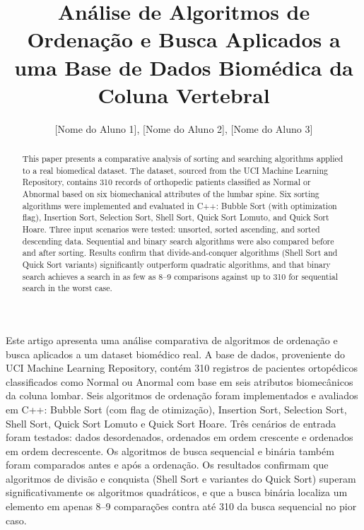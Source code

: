 \documentclass[12pt]{article}
\title{Análise de Algoritmos de Ordenação e Busca Aplicados a uma Base de Dados Biomédica da Coluna Vertebral}
\author{[Nome do Aluno 1]\inst{1}, [Nome do Aluno 2]\inst{1}, [Nome do Aluno 3]\inst{1}}
\begin{document}
\maketitle

\begin{abstract}
This paper presents a comparative analysis of sorting and searching algorithms applied to a real biomedical dataset. The dataset, sourced from the UCI Machine Learning Repository, contains 310 records of orthopedic patients classified as Normal or Abnormal based on six biomechanical attributes of the lumbar spine. Six sorting algorithms were implemented and evaluated in C++: Bubble Sort (with optimization flag), Insertion Sort, Selection Sort, Shell Sort, Quick Sort Lomuto, and Quick Sort Hoare. Three input scenarios were tested: unsorted, sorted ascending, and sorted descending data. Sequential and binary search algorithms were also compared before and after sorting. Results confirm that divide-and-conquer algorithms (Shell Sort and Quick Sort variants) significantly outperform quadratic algorithms, and that binary search achieves a search in as few as 8--9 comparisons against up to 310 for sequential search in the worst case.
\end{abstract}

\begin{resumo}
Este artigo apresenta uma análise comparativa de algoritmos de ordenação e busca aplicados a um dataset biomédico real. A base de dados, proveniente do UCI Machine Learning Repository, contém 310 registros de pacientes ortopédicos classificados como Normal ou Anormal com base em seis atributos biomecânicos da coluna lombar. Seis algoritmos de ordenação foram implementados e avaliados em C++: Bubble Sort (com flag de otimização), Insertion Sort, Selection Sort, Shell Sort, Quick Sort Lomuto e Quick Sort Hoare. Três cenários de entrada foram testados: dados desordenados, ordenados em ordem crescente e ordenados em ordem decrescente. Os algoritmos de busca sequencial e binária também foram comparados antes e após a ordenação. Os resultados confirmam que algoritmos de divisão e conquista (Shell Sort e variantes do Quick Sort) superam significativamente os algoritmos quadráticos, e que a busca binária localiza um elemento em apenas 8--9 comparações contra até 310 da busca sequencial no pior caso.
\end{resumo}

\end{document}
